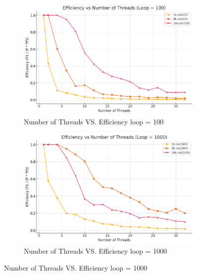 \documentclass[letterpaper,12pt]{article}
\theoremstyle{remark}
\begin{document}
\begin{figure}[H]
    \centering
    \begin{subfigure}[t]{0.48\textwidth}  %
        \centering
        \includegraphics[width=\textwidth]{efficiency100.png}
        \caption{Number of Threads VS. Efficiency loop = 100}
        \label{fig:ThreadVsEfficiency}
    \end{subfigure}
    \hfill  %
    \begin{subfigure}[t]{0.48\textwidth}  %
        \centering
        \includegraphics[width=\textwidth]{efficiencyloop1000.png}
        \caption{Number of Threads VS. Efficiency loop = 1000}
        \label{fig:ThreadVsEfficiency}
    \end{subfigure}

   \label{fig:ThreadVsEfficiency}
\end{figure}
\hfill  %
\end{document}
